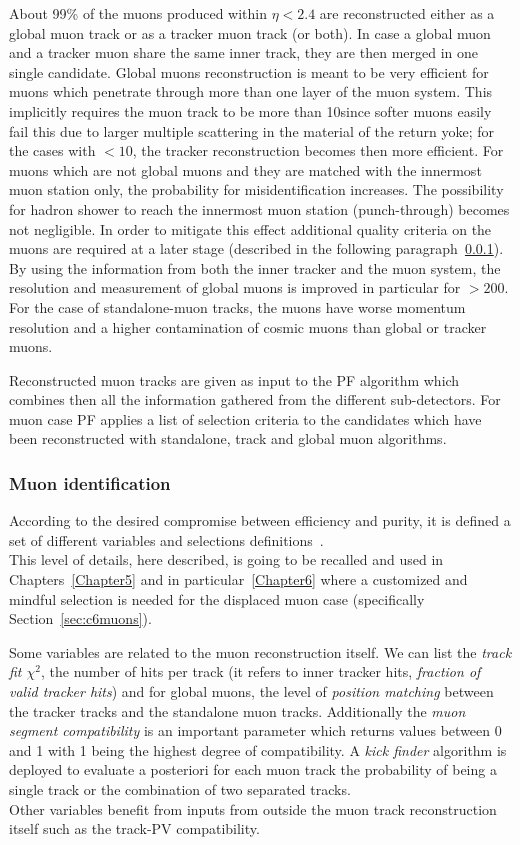 About 99\% of the muons produced within $\eta < 2.4$ are reconstructed
either as a global muon track or as a tracker muon track (or
both). In case a global muon and a tracker muon share the same inner
track, they are then merged in one single candidate.
Global muons reconstruction is meant to be very efficient for muons
which penetrate
through more than one layer of the muon system. This implicitly
requires the muon track to be more than 10\GeV since softer muons
easily fail this due to larger multiple scattering in the material of the return yoke; for the cases with
\pt$< 10$\GeV, the tracker reconstruction becomes then more efficient.
For muons which are not global muons and
they are matched with the innermost muon station only,
the probability for misidentification increases. The possibility for
hadron shower to reach the innermost muon station (punch-through)
becomes not negligible. In order to mitigate this effect additional
quality criteria on the muons are required at a later stage (described
in the following paragraph~\ref{sec:c2muonselection}).
By using the information from both the
inner tracker and the muon
system, the \pt resolution and measurement of global muons is improved
in particular for \pt $> 200$\GeV. For the case of standalone-muon
tracks, the muons have worse momentum resolution and a higher
contamination of cosmic muons than global or tracker muons.

Reconstructed muon tracks are given as input to the PF algorithm which
combines then all the information gathered from the different
sub-detectors. For muon case PF applies a list of selection criteria
to the candidates which have been reconstructed with standalone, track
and global muon algorithms. 

\subsubsection{Muon identification}\label{sec:c2muonselection}
According to the desired compromise between efficiency and purity, it
is defined a set of different variables and selections definitions~\cite{Sirunyan_2018_muon}.\\
This level of details, here described, is going to be recalled and
used in Chapters~\ref{Chapter5} and in particular~\ref{Chapter6} where a customized and mindful selection is needed
for the displaced muon case (specifically Section~\ref{sec:c6muons}).

Some variables are related to the muon reconstruction itself. We can
list the \emph{track fit $\chi^2$}, the number of hits per track (it refers
to inner tracker hits, \emph{fraction of valid tracker hits}) and for global muons, the
level of \emph{position matching} between the tracker tracks and the standalone muon
tracks. Additionally the \emph{muon segment
compatibility} is an important parameter which returns values between 0
and 1 with 1 being the highest degree of compatibility. A \emph{kick
  finder} algorithm is deployed to evaluate a posteriori for each muon
track the
probability of being a single track or the combination of two
separated tracks.  \\
Other variables benefit from inputs from outside the muon track
reconstruction itself such as the track-PV compatibility.

